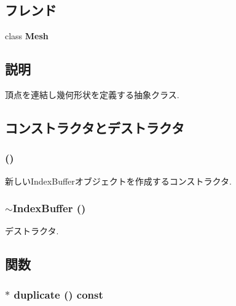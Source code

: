 \subsection*{フレンド}
\begin{CompactItemize}
\item 
\hypertarget{classm3g_1_1IndexBuffer_a41a130f156b145bffb3f4b5172c4c93}{
class \textbf{Mesh}}
\label{classm3g_1_1IndexBuffer_a41a130f156b145bffb3f4b5172c4c93}

\end{CompactItemize}


\subsection{説明}
頂点を連結し幾何形状を定義する抽象クラス. 

\subsection{コンストラクタとデストラクタ}
\hypertarget{classm3g_1_1IndexBuffer_d2e68a2d7c6c753d3abfeef42ee79427}{
\subsubsection[{IndexBuffer}]{ ()}}
\label{classm3g_1_1IndexBuffer_d2e68a2d7c6c753d3abfeef42ee79427}


新しいIndexBufferオブジェクトを作成するコンストラクタ. \hypertarget{classm3g_1_1IndexBuffer_ac7952364fe4d2d7b2731da5380c841c}{
\subsubsection[{$\sim$IndexBuffer}]{\setlength{\rightskip}{0pt plus 5cm}$\sim${\bf IndexBuffer} ()}}
\label{classm3g_1_1IndexBuffer_ac7952364fe4d2d7b2731da5380c841c}


デストラクタ. 

\subsection{関数}
\hypertarget{classm3g_1_1IndexBuffer_fab6fc0a0ec393e527f849c3af10ad76}{
\subsubsection[{duplicate}]{ $\ast$ duplicate () const}}
\label{classm3g_1_1IndexBuffer_fab6fc0a0ec393e527f849c3af10ad76}


